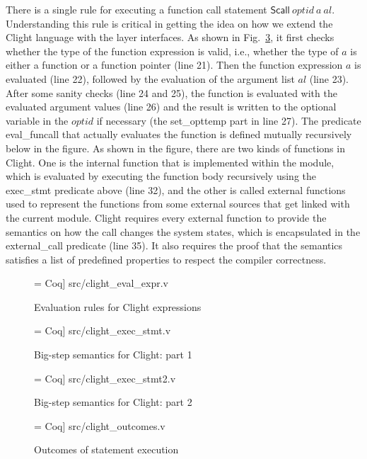 There is a single rule for executing a function call statement
$\textsf{Scall}~optid~a~al$.
Understanding this rule is critical in getting the idea on how we extend the
Clight language with the layer interfaces. As shown in
Fig.~\ref{fig:clight_exec_stmt2}, it first checks whether the type
of the function expression is valid, i.e., whether the type of $a$ is
either a function or a function pointer (line 21).
Then the function expression $a$ is evaluated (line 22), followed
by the evaluation of the argument list $al$ (line 23). After some sanity checks
(line 24 and 25), the function is evaluated with the evaluated argument values
(line 26) and the result is written to the optional variable in the $optid$
if necessary (the \textsf{set\_opttemp} part in line 27).
The predicate \textsf{eval\_funcall} that actually evaluates the function
is defined mutually recursively below in the figure. 
As shown in the figure, there are two kinds of functions in Clight.
One is the internal function that is implemented within the module,
which is evaluated by executing the function body recursively using
the \textsf{exec\_stmt} predicate above (line 32), and the other
is called external functions used to represent the functions from
some external sources that get linked with the current module.
Clight requires every external function to provide the semantics on
how the call changes the system states, which is encapsulated in
the \textsf{external\_call} predicate (line 35). It also requires
the proof that the semantics satisfies a list of predefined properties
to respect the compiler correctness.

\begin{figure}
 = Coq] {src/clight_eval_expr.v}
\caption{Evaluation rules for Clight expressions}
\label{fig:clight_eval_expr}
\end{figure}

\begin{figure}
 = Coq] {src/clight_exec_stmt.v}
\caption{Big-step semantics for Clight: part 1}
\label{fig:clight_exec_stmt}
\end{figure}

\begin{figure}
 = Coq] {src/clight_exec_stmt2.v}
\caption{Big-step semantics for Clight: part 2}
\label{fig:clight_exec_stmt2}
\end{figure}

\begin{figure}
 = Coq] {src/clight_outcomes.v}
\caption{Outcomes of statement execution}
\label{fig:clight_outcomes}
\end{figure}


